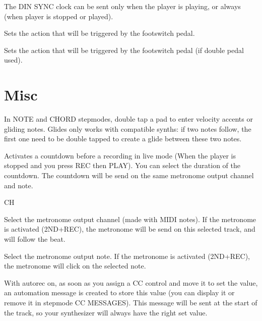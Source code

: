 The DIN SYNC clock can be sent only when the player is playing, or always (when player is stopped or played).

   

Sets the action that will be triggered by the footswitch pedal.

   

Sets the action that will be triggered by the footswitch pedal (if double pedal used).


\section{Misc}

  

In NOTE and CHORD stepmodes, double tap a pad to enter velocity accents or gliding notes. Glides only works with compatible synths: if two notes follow, the first one need to be double tapped to create a glide between these two notes.

     

Activates a countdown before a recording in live mode (When the player is stopped and you press REC then PLAY). You can select the duration of the countdown. The countdown will be send on the same metronome output channel and note.

 CH     

Select the metronome output channel (made with MIDI notes). If the metronome is activated (2ND+REC), the metronome will be send on this selected track, and will follow the beat.

  

Select the metronome output note. If the metronome is activated (2ND+REC), the metronome will click on the selected note.

  

With autorec on, as soon as you assign a CC control and move it to set the value, an automation message is created to store this value (you can display it or remove it in stepmode CC MESSAGES). This message will be sent at the start of the track, so your synthesizer will always have the right set value.

